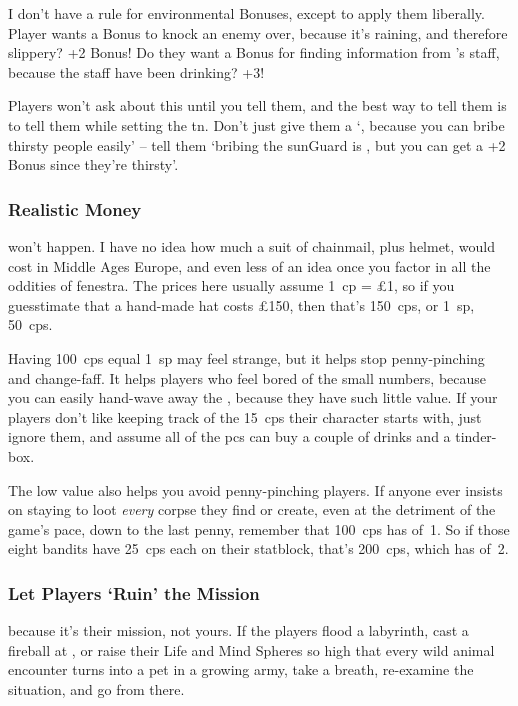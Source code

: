 \begin{multicols}{2}
I don't have a rule for environmental Bonuses, except to apply them liberally.
Player wants a Bonus to knock an enemy over, because it's raining, and therefore slippery?
+2 Bonus!
Do they want a Bonus for finding information from 's staff, because the staff have been drinking?
+3!

Players won't ask about this until you tell them, and the best way to tell them is to tell them while setting the \gls{tn}.
Don't just give them a `\tn[8], because you can bribe thirsty people easily' -- tell them `bribing the \gls{sunGuard} is \tn[10], but you can get a +2 Bonus since they're thirsty'.

\subsubsection{Realistic Money}
won't happen.
I have no idea how much a suit of chainmail, plus helmet, would cost in Middle Ages Europe, and even less of an idea once you factor in all the oddities of \gls{fenestra}.
The prices here usually assume 1~\gls{cp} = \pounds1, so if you guesstimate that a hand-made hat costs \pounds150, then that's 150~\glspl{cp}, or 1~\gls{sp}, 50~\glspl{cp}.

Having 100~\glspl{cp} equal 1~\gls{sp} may feel strange, but it helps stop penny-pinching and change-faff.
It helps players who feel bored of the small numbers, because you can easily hand-wave away the , because they have such little value.
If your players don't like keeping track of the 15~\glspl{cp} their character starts with, just ignore them, and assume all of the \glspl{pc} can buy a couple of drinks and a tinder-box.

The low value also helps you avoid penny-pinching players.
If anyone ever insists on staying to loot \emph{every} corpse they find or create, even at the detriment of the game's pace, down to the last penny, remember that 100~\glspl{cp} has  of~1.
So if those eight bandits have 25~\glspl{cp} each on their statblock, that's 200~\glspl{cp}, which has  of~2.

\subsubsection{Let Players `Ruin' the Mission}
because it's their mission, not yours.
If the players flood a labyrinth, cast a fireball at , or raise their Life and Mind Spheres so high that every wild animal encounter turns into a pet in a growing army, take a breath, re-examine the situation, and go from there.


\end{multicols}

